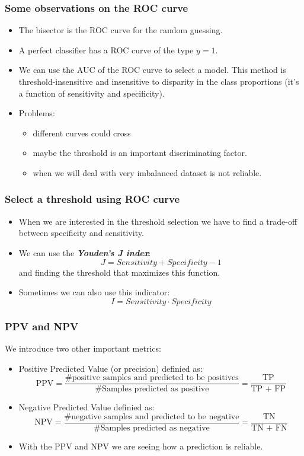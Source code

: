 \documentclass[9pt]{beamer}
\begin{document}
\begin{frame}
\frametitle{Some observations on the ROC curve}
\begin{itemize}
\item The bisector is the ROC curve for the random guessing.
\item A perfect classifier has a ROC curve of the type $y=1$. 
\item We can use the AUC of the ROC curve to select a model. This method is threshold-insensitive and insensitive to disparity in the class proportions (it's a function of sensitivity and specificity).
\item Problems:
\begin{itemize}
\item different curves could cross
\item maybe the threshold is an important discriminating factor.
\item when we will deal with very imbalanced dataset is not reliable.
\end{itemize}
\end{itemize}
\end{frame}

\begin{frame}
\frametitle{Select a threshold using ROC curve}
\begin{itemize}
\item When we are interested in the threshold selection we have to find a trade-off between specificity and sensitivity.
\item We can use the \textbf{\textit{Youden's J index}}:
$$
J = Sensitivity + Specificity - 1
$$
and finding the threshold that maximizes this function.
\item Sometimes we can also use this indicator:
$$
I = Sensitivity\cdot Specificity
$$
\end{itemize}
\end{frame}

\begin{frame}
\frametitle{PPV and NPV}
We introduce two other important metrics:
\begin{itemize}
\item Positive Predicted Value (or precision) definied as:
$$
\mbox{PPV} = \dfrac{\# \mbox{positive samples and predicted to be positives}}{\# \mbox{Samples predicted as positive}} = \dfrac{\mbox{TP}}{\mbox{TP + FP}}
$$
\item Negative Predicted Value definied as:
$$
\mbox{NPV} = \dfrac{\# \mbox{negative samples and predicted to be negative}}{\# \mbox{Samples predicted as negative}} = \dfrac{\mbox{TN}}{\mbox{TN + FN}}
$$
\item With the PPV and NPV we are seeing how a prediction is reliable.
\end{itemize}
\end{frame}
\end{document}
